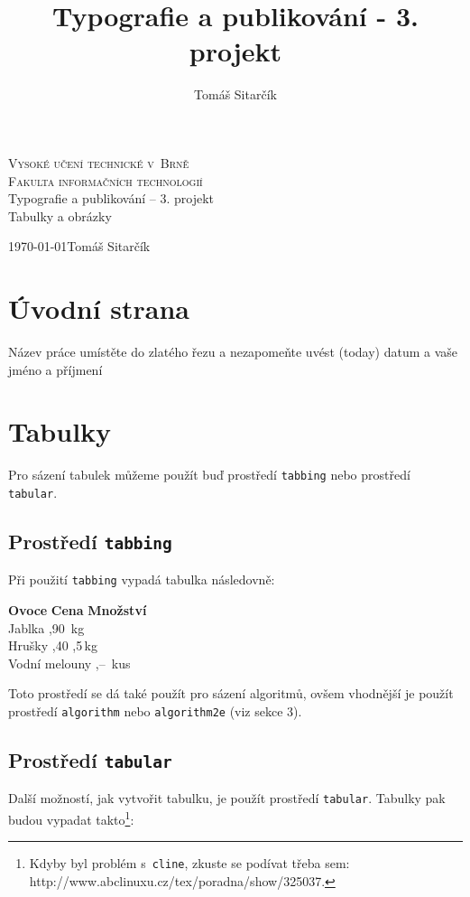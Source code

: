 \documentclass[11pt, a4paper]{article}
\title{Typografie a publikování - 3. projekt}
\author{Tomáš Sitarčík}
\begin{document}
\begin{titlepage}
    \begin{center}

        \Huge
        \textsc{Vysoké učení technické v~Brně\\Fakulta informačních technologií}\\
        \LARGE
        Typografie a publikování -- 3. projekt\\\Huge Tabulky a obrázky

        {\Large \today \hfill Tomáš Sitarčík}

    \end{center}
\end{titlepage}
\newpage

\section{Úvodní strana}
Název práce umístěte do zlatého řezu a nezapomeňte uvést  (today) datum a vaše jméno a příjmení

\section{Tabulky}
Pro sázení tabulek můžeme použít buď prostředí \verb|tabbing| nebo prostředí \verb|tabular|.

\subsection{Prostředí \texttt{tabbing}}
Při použití \verb|tabbing| vypadá tabulka následovně:
\begin{tabbing}
    \textbf{Ovoce} \qquad \qquad \= \textbf{Cena} \quad \= \textbf{Množství} \\
    Jablka ,90 \,kg \\
    Hrušky ,40 ,5\,kg \\
    Vodní melouny ,-- \,kus
\end{tabbing}

Toto prostředí se dá také použít pro sázení algoritmů, ovšem vhodnější je použít prostředí \verb|algorithm| nebo \verb|algorithm2e| (viz sekce 3).

\subsection{Prostředí \texttt{tabular}}
Další možností, jak vytvořit tabulku, je použít prostředí \texttt{tabular}. Tabulky pak budou vypadat takto\footnote[1]{Kdyby byl problém s~\texttt{cline}, zkuste se podívat třeba sem: http://www.abclinuxu.cz/tex/poradna/show/325037.}:
\end{document}
